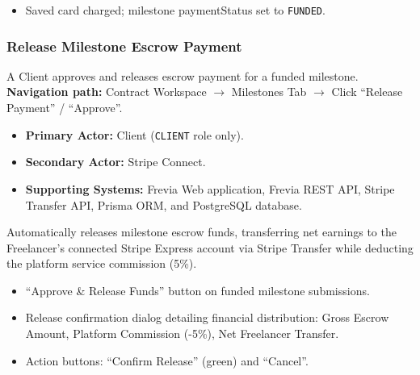 \begin{itemize}[leftmargin=1.6em,topsep=3pt,itemsep=2pt,parsep=0pt,label=$\bullet$]
      \item Saved card charged; milestone paymentStatus set to \texttt{FUNDED}.
\end{itemize}

\subsubsection{ Release Milestone Escrow Payment}

A Client approves and releases escrow payment for a funded milestone.\newline
\textbf{Navigation path:} Contract Workspace $\rightarrow$ Milestones Tab $\rightarrow$ Click ``Release Payment'' / ``Approve''.


\begin{itemize}[leftmargin=1.6em,topsep=3pt,itemsep=2pt,parsep=0pt,label=$\bullet$]
      \item \textbf{Primary Actor:} Client (\texttt{CLIENT} role only).
      \item \textbf{Secondary Actor:} Stripe Connect.
      \item \textbf{Supporting Systems:} Frevia Web application, Frevia REST API, Stripe Transfer API, Prisma ORM, and PostgreSQL database.
\end{itemize}

\noindent Automatically releases milestone escrow funds, transferring net earnings to the Freelancer's connected Stripe Express account via Stripe Transfer while deducting the platform service commission (5\%).

\begin{itemize}[leftmargin=1.6em,topsep=3pt,itemsep=2pt,parsep=0pt,label=$\bullet$]
      \item ``Approve \& Release Funds'' button on funded milestone submissions.
      \item Release confirmation dialog detailing financial distribution: Gross Escrow Amount, Platform Commission (-5\%), Net Freelancer Transfer.
      \item Action buttons: ``Confirm Release'' (green) and ``Cancel''.
\end{itemize}

